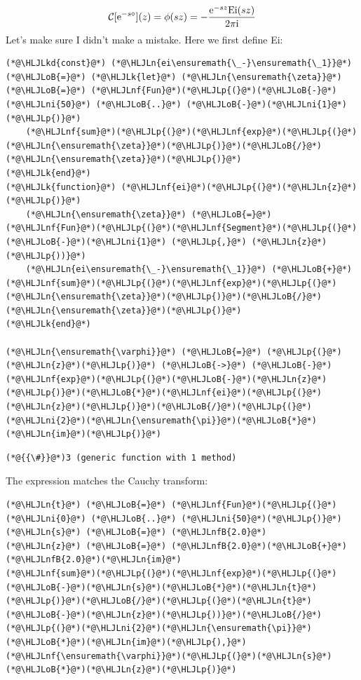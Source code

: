 \documentclass[12pt,a4paper]{article}
\newcommand{\HLJLk}[1]{\textcolor[RGB]{148,91,176}{\textbf{#1}}}
\newcommand{\HLJLkd}[1]{\textcolor[RGB]{214,102,97}{\textit{#1}}}
\newcommand{\HLJLn}[1]{#1}
\newcommand{\HLJLnf}[1]{\textcolor[RGB]{66,102,213}{#1}}
\newcommand{\HLJLnfB}[1]{\textcolor[RGB]{59,151,46}{#1}}
\newcommand{\HLJLni}[1]{\textcolor[RGB]{59,151,46}{#1}}
\newcommand{\HLJLoB}[1]{\textcolor[RGB]{102,102,102}{\textbf{#1}}}
\newcommand{\HLJLp}[1]{#1}
\def\I{ {\rm i} }
\def\E{ {\rm e} }
\def\CC{ {\cal C} }
\begin{document}
\[
\CC[ \E^{-s \diamond}](z) = \phi(s z) = - {\E^{-s z} {\rm Ei}(s z)  \over 2 \pi \I}
\]
Let's make sure I didn't make a mistake. Here we first define Ei:


\begin{lstlisting}
(*@\HLJLkd{const}@*) (*@\HLJLn{ei\ensuremath{\_-}\ensuremath{\_1}}@*) (*@\HLJLoB{=}@*) (*@\HLJLk{let}@*) (*@\HLJLn{\ensuremath{\zeta}}@*) (*@\HLJLoB{=}@*) (*@\HLJLnf{Fun}@*)(*@\HLJLp{(}@*)(*@\HLJLoB{-}@*)(*@\HLJLni{50}@*) (*@\HLJLoB{..}@*) (*@\HLJLoB{-}@*)(*@\HLJLni{1}@*)(*@\HLJLp{)}@*)
    (*@\HLJLnf{sum}@*)(*@\HLJLp{(}@*)(*@\HLJLnf{exp}@*)(*@\HLJLp{(}@*)(*@\HLJLn{\ensuremath{\zeta}}@*)(*@\HLJLp{)}@*)(*@\HLJLoB{/}@*)(*@\HLJLn{\ensuremath{\zeta}}@*)(*@\HLJLp{)}@*)
(*@\HLJLk{end}@*)
(*@\HLJLk{function}@*) (*@\HLJLnf{ei}@*)(*@\HLJLp{(}@*)(*@\HLJLn{z}@*)(*@\HLJLp{)}@*) 
    (*@\HLJLn{\ensuremath{\zeta}}@*) (*@\HLJLoB{=}@*) (*@\HLJLnf{Fun}@*)(*@\HLJLp{(}@*)(*@\HLJLnf{Segment}@*)(*@\HLJLp{(}@*)(*@\HLJLoB{-}@*)(*@\HLJLni{1}@*) (*@\HLJLp{,}@*) (*@\HLJLn{z}@*)(*@\HLJLp{))}@*)
    (*@\HLJLn{ei\ensuremath{\_-}\ensuremath{\_1}}@*) (*@\HLJLoB{+}@*) (*@\HLJLnf{sum}@*)(*@\HLJLp{(}@*)(*@\HLJLnf{exp}@*)(*@\HLJLp{(}@*)(*@\HLJLn{\ensuremath{\zeta}}@*)(*@\HLJLp{)}@*)(*@\HLJLoB{/}@*)(*@\HLJLn{\ensuremath{\zeta}}@*)(*@\HLJLp{)}@*)
(*@\HLJLk{end}@*)

(*@\HLJLn{\ensuremath{\varphi}}@*) (*@\HLJLoB{=}@*) (*@\HLJLp{(}@*)(*@\HLJLn{z}@*)(*@\HLJLp{)}@*) (*@\HLJLoB{->}@*) (*@\HLJLoB{-}@*)(*@\HLJLnf{exp}@*)(*@\HLJLp{(}@*)(*@\HLJLoB{-}@*)(*@\HLJLn{z}@*)(*@\HLJLp{)}@*)(*@\HLJLoB{*}@*)(*@\HLJLnf{ei}@*)(*@\HLJLp{(}@*)(*@\HLJLn{z}@*)(*@\HLJLp{)}@*)(*@\HLJLoB{/}@*)(*@\HLJLp{(}@*)(*@\HLJLni{2}@*)(*@\HLJLn{\ensuremath{\pi}}@*)(*@\HLJLoB{*}@*)(*@\HLJLn{im}@*)(*@\HLJLp{)}@*)
\end{lstlisting}

\begin{lstlisting}
(*@{{\#}}@*)3 (generic function with 1 method)
\end{lstlisting}


The expression matches the Cauchy transform:


\begin{lstlisting}
(*@\HLJLn{t}@*) (*@\HLJLoB{=}@*) (*@\HLJLnf{Fun}@*)(*@\HLJLp{(}@*)(*@\HLJLni{0}@*) (*@\HLJLoB{..}@*) (*@\HLJLni{50}@*)(*@\HLJLp{)}@*)
(*@\HLJLn{s}@*) (*@\HLJLoB{=}@*) (*@\HLJLnfB{2.0}@*)
(*@\HLJLn{z}@*) (*@\HLJLoB{=}@*) (*@\HLJLnfB{2.0}@*)(*@\HLJLoB{+}@*)(*@\HLJLnfB{2.0}@*)(*@\HLJLn{im}@*)
(*@\HLJLnf{sum}@*)(*@\HLJLp{(}@*)(*@\HLJLnf{exp}@*)(*@\HLJLp{(}@*)(*@\HLJLoB{-}@*)(*@\HLJLn{s}@*)(*@\HLJLoB{*}@*)(*@\HLJLn{t}@*)(*@\HLJLp{)}@*)(*@\HLJLoB{/}@*)(*@\HLJLp{(}@*)(*@\HLJLn{t}@*)(*@\HLJLoB{-}@*)(*@\HLJLn{z}@*)(*@\HLJLp{))}@*)(*@\HLJLoB{/}@*)(*@\HLJLp{(}@*)(*@\HLJLni{2}@*)(*@\HLJLn{\ensuremath{\pi}}@*)(*@\HLJLoB{*}@*)(*@\HLJLn{im}@*)(*@\HLJLp{),}@*) (*@\HLJLnf{\ensuremath{\varphi}}@*)(*@\HLJLp{(}@*)(*@\HLJLn{s}@*)(*@\HLJLoB{*}@*)(*@\HLJLn{z}@*)(*@\HLJLp{)}@*)
\end{lstlisting}
\end{document}
